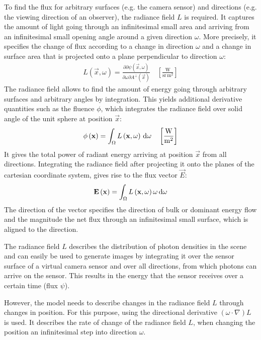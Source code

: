 To find the flux for arbitrary surfaces (e.g. the camera sensor) and directions (e.g. the viewing direction of an observer), the radiance field $L$ is required. It captures the amount of light going through an infinitesimal small area and arriving from an infinitesimal small opening angle around a given direction $\omega$. More precisely, it specifies the change of flux according to a change in direction $\omega$ and a change in surface area that is projected onto a plane perpendicular to direction $\omega$:
\begin{align*}
L\left(\vec{x}, \omega\right) = \frac{\partial\partial\psi\left(\vec{x}, \omega\right)}{\partial\omega\partial A^\perp\left(\vec{x}\right)}
\quad
\left[\frac{\si{\watt}}{\si{\steradian}\, \si{\meter}^2}\right]
\end{align*}
The radiance field allows to find the amount of energy going through arbitrary surfaces and arbitrary angles by integration. This yields additional derivative quantities such as the fluence $\phi$, which integrates the radiance field over solid angle of the unit sphere at position $\vec{x}$:
\begin{align*}
\phi\left(\mathbf{x}\right) = \int_\Omega L\left(\mathbf{x}, \omega\right) \,\mathrm{d}\omega
\quad
\left[\frac{\si{\watt}}{\si{\meter}^2}\right]
\end{align*}
It gives the total power of radiant energy arriving at position $\vec{x}$ from all directions. Integrating the radiance field after projecting it onto the planes of the cartesian coordinate system, gives rise to the flux vector $\vec{E}$:
\begin{align*}
\mathbf{E}\left(\mathbf{x}\right) = \int_\Omega L\left(\mathbf{x}, \omega\right)\omega \,\mathrm{d}\omega
\end{align*}
The direction of the vector specifies the direction of bulk or dominant energy flow and the magnitude the net flux through an infinitesimal small surface, which is aligned to the direction.

The radiance field $L$ describes the distribution of photon densities in the scene and can easily be used to generate images by integrating it over the sensor surface of a virtual camera sensor and over all directions, from which photons can arrive on the sensor. This results in the energy that the sensor receives over a certain time (flux $\psi$).


However, the model needs to describe changes in the radiance field $L$ through changes in position. For this purpose, using the directional derivative $\left(\omega\cdot\nabla\right)L$ is used. It describes the rate of change of the radiance field $L$, when changing the position an infinitesimal step into direction $\omega$.

